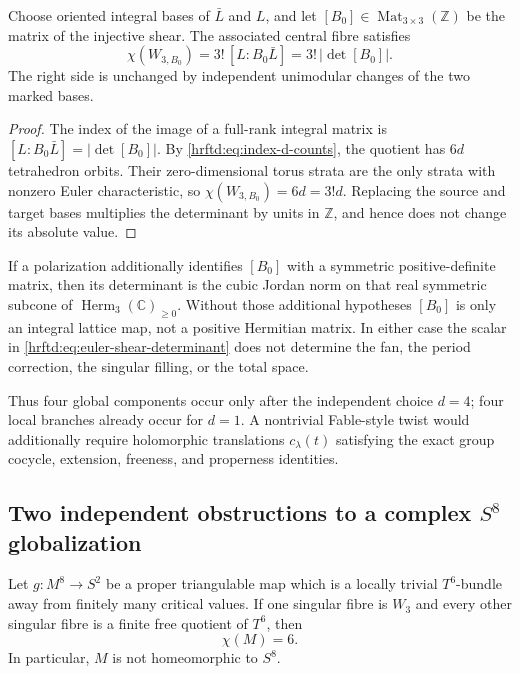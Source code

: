 \begin{corollary}
\label{hrftd:cor:euler-shear-determinant}
Choose oriented integral bases of \(\bar L\) and \(L\), and let
\([B_0]\in\operatorname{Mat}_{3\times3}(\mathbb Z)\) be the matrix of the
injective shear.  The associated central fibre satisfies
\begin{equation}
 \chi(W_{3,B_0})
 =3!\,[L:B_0\bar L]
 =3!\,|\det[B_0]|.
 \label{hrftd:eq:euler-shear-determinant}
\end{equation}
The right side is unchanged by independent unimodular changes of the two
marked bases.
\end{corollary}

\begin{proof}
The index of the image of a full-rank integral matrix is
\([L:B_0\bar L]=|\det[B_0]|\).  By
\eqref{hrftd:eq:index-d-counts}, the quotient has \(6d\) tetrahedron orbits.
Their zero-dimensional torus strata are the only strata with nonzero Euler
characteristic, so \(\chi(W_{3,B_0})=6d=3!d\).  Replacing the source and
target bases multiplies the determinant by units in \(\mathbb Z\), and hence
does not change its absolute value.
\end{proof}

If a polarization additionally identifies \([B_0]\) with a symmetric
positive-definite matrix, then its determinant is the cubic Jordan norm on
that real symmetric subcone of
\(\operatorname{Herm}_3(\mathbb C)_{\geq0}\).  Without those additional
hypotheses \([B_0]\) is only an integral lattice map, not a positive
Hermitian matrix.  In either case the scalar in
\eqref{hrftd:eq:euler-shear-determinant} does not determine the fan, the
period correction, the singular filling, or the total space.

Thus four global components occur only after the independent choice \(d=4\);
four local branches already occur for \(d=1\).  A nontrivial Fable-style
twist would additionally require holomorphic translations
\(c_\lambda(t)\) satisfying the exact group cocycle, extension, freeness,
and properness identities.

\subsection{Two independent obstructions to a complex
\texorpdfstring{$S^8$}{S8} globalization}
\label{hrftd:s8-obstructions}

\begin{theorem}
\label{hrftd:thm:euler-obstruction}
Let \(g:M^8\to S^2\) be a proper triangulable map which is a locally trivial
\(T^6\)-bundle away from finitely many critical values.  If one singular
fibre is \(W_3\) and every other singular fibre is a finite free quotient of
\(T^6\), then
\[
 \chi(M)=6.
\]
In particular, \(M\) is not homeomorphic to \(S^8\).
\end{theorem}

